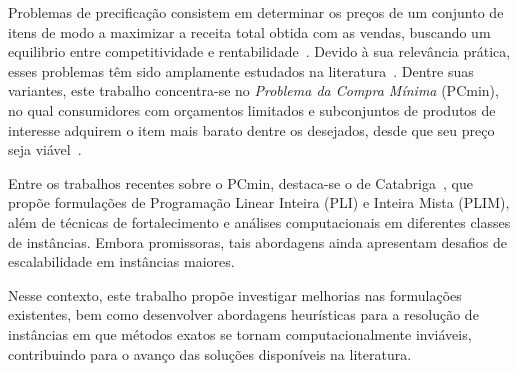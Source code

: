 Problemas de precificação consistem em determinar os preços de um conjunto de itens de modo a maximizar a receita total obtida com as vendas, buscando um equilibrio entre competitividade e rentabilidade~\cite{smith1986}. Devido à sua relevância prática, esses problemas têm sido amplamente estudados na literatura~\cite{aggarwal2004,venkatesan2005,shmuel1984,shmuel1987,smith1986}. Dentre suas variantes, este trabalho concentra-se no \textit{Problema da Compra Mínima} (PCmin), no qual consumidores com orçamentos limitados e subconjuntos de produtos de interesse adquirem o item mais barato dentre os desejados, desde que seu preço seja viável~\cite{rusmevichientong2006}.

Entre os trabalhos recentes sobre o PCmin, destaca-se o de Catabriga~\cite{catabriga2025}, que propõe formulações de Programação Linear Inteira (PLI) e Inteira Mista (PLIM), além de técnicas de fortalecimento e análises computacionais em diferentes classes de instâncias. Embora promissoras, tais abordagens ainda apresentam desafios de escalabilidade em instâncias maiores.

Nesse contexto, este trabalho propõe investigar melhorias nas formulações existentes, bem como desenvolver abordagens heurísticas para a resolução de instâncias em que métodos exatos se tornam computacionalmente inviáveis, contribuindo para o avanço das soluções disponíveis na literatura.